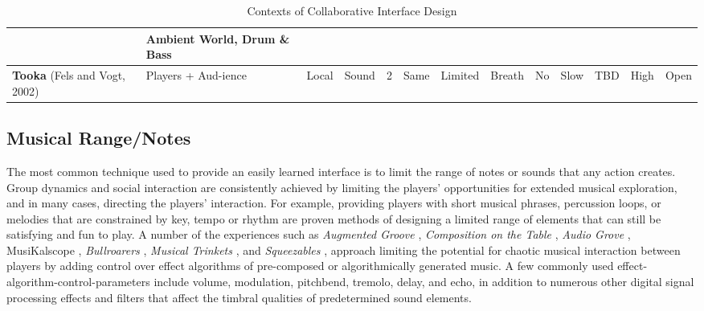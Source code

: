 \begin{center}
\begin{table}[ht]
\begin{tabular}{|p{41pt}|p{22pt}|p{22pt}|p{26pt}|p{17pt}|p{26pt}|p{31pt}|p{35pt}|p{33pt}|p{24pt}|p{35pt}|p{26pt}|p{36pt}|}
{} & \parbox{36pt}{\raggedright 
{\small Ambient World,  Drum \& Bass }
} \\
\hline
\parbox{41pt}{\raggedright 
{\small \textbf{Tooka }(Fels and Vogt, 2002)}
} & \parbox{22pt}{\raggedright 
{\small Players + Aud-ience}
} & \parbox{22pt}{\raggedright 
{\small Local}
} & \parbox{26pt}{\raggedright 
{\small Sound}
} & \parbox{17pt}{\raggedright 
{\small 2}
} & \parbox{26pt}{\raggedright 
{\small Same}
} & \parbox{31pt}{\centering 
{\small Limited}
} & \parbox{35pt}{\centering 
{\small Breath}
} & \parbox{33pt}{\centering 
{\small No}
} & \parbox{24pt}{\centering 
{\small Slow}
} & \parbox{35pt}{\centering 
{\small TBD}
} & \parbox{26pt}{\centering 
{\small High}
} & \parbox{36pt}{\raggedright 
{\small Open}
} \\
\hline
\end{tabular}
\vspace{2pt}

\caption{Contexts of Collaborative Interface Design}
\end{table}

\end{center}



\subsection{Musical Range/Notes}

The most common technique used to provide an easily learned interface is to
limit the range of notes or sounds that any action creates. Group dynamics and
social interaction are consistently achieved by limiting the players'
opportunities for extended musical exploration, and in many cases, directing the
players' interaction. For example, providing players with short musical phrases,
percussion loops, or  melodies that are constrained by key, tempo or rhythm are
proven methods of designing a limited range of elements that can still be
satisfying and fun to play.  A number of the experiences such as
\textit{Augmented Groove } \cite{Poupyrev:2001}, \textit{Composition on the Table} \cite{Iwai:1998},
\textit{Audio Grove} \cite{Moller:1997}, MusiKalscope \cite{Fels:1997}, \textit{Bullroarers} \cite{Robson:2001},
\textit{Musical Trinkets } \cite{Paradiso:2001},\textit{ }and\textit{ Squeezables} \cite{Weinberg:2001}, approach
limiting the potential for chaotic musical interaction between players by adding
control over effect algorithms of pre-composed or algorithmically generated
music. A few commonly used effect-algorithm-control-parameters include volume,
modulation, pitchbend, tremolo, delay, and echo, in addition to numerous other
digital signal processing effects and filters that affect the timbral qualities
of predetermined sound elements.

